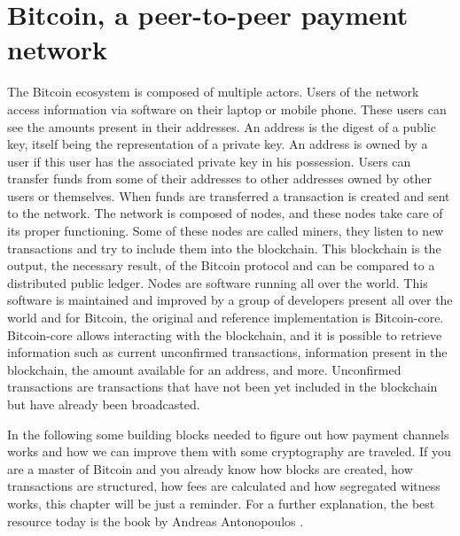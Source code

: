 \chapter{Bitcoin, a peer-to-peer payment network}
\label{chap:bitcoin}

The Bitcoin ecosystem is composed of multiple actors. Users of the network
access information via software on their laptop or mobile phone. These users can
see the amounts present in their addresses. An address is the digest of a public
key, itself being the representation of a private key. An address is owned by a
user if this user has the associated private key in his possession. Users can
transfer funds from some of their addresses to other addresses owned by other
users or themselves. When funds are transferred a transaction is created and
sent to the network. The network is composed of nodes, and these nodes take care
of its proper functioning. Some of these nodes are called miners, they listen to
new transactions and try to include them into the blockchain. This blockchain is
the output, the necessary result, of the Bitcoin protocol and can be compared to
a distributed public ledger. Nodes are software running all over the world. This
software is maintained and improved by a group of developers present all over
the world and for Bitcoin, the original and reference implementation is
Bitcoin-core. Bitcoin-core allows interacting with the blockchain, and it is
possible to retrieve information such as current unconfirmed transactions,
information present in the blockchain, the amount available for an address, and
more. Unconfirmed transactions are transactions that have not been yet included
in the blockchain but have already been broadcasted.

In the following some building blocks needed to figure out how payment channels
works and how we can improve them with some cryptography are traveled. If you
are a master of Bitcoin and you already know how blocks are created, how
transactions are structured, how fees are calculated and how segregated witness
works, this chapter will be just a reminder. For a further explanation, the best
resource today is the book  by Andreas Antonopoulos
\cite{Antonopoulos:2014:MBU:2695500}.


\minitoc

\newpage

